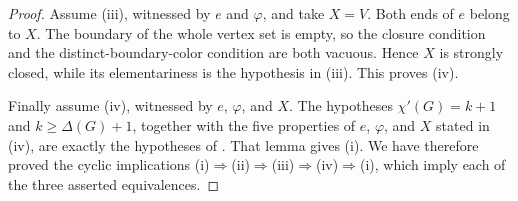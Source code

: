 \begin{proof}
Assume (iii), witnessed by $e$ and $\varphi$, and take $X=V$.  Both ends of
$e$ belong to $X$.  The boundary of the whole vertex set is empty, so the
closure condition and the distinct-boundary-color condition are both
vacuous.  Hence $X$ is strongly closed, while its elementariness is the
hypothesis in (iii).  This proves (iv).

Finally assume (iv), witnessed by $e$, $\varphi$, and $X$.  The hypotheses
$\chi'(G)=k+1$ and $k\geq\Delta(G)+1$, together with the five properties of
$e$, $\varphi$, and $X$ stated in (iv), are exactly the hypotheses of
.  That lemma gives (i).  We have
therefore proved the cyclic implications
(i)$\Rightarrow$(ii)$\Rightarrow$(iii)$\Rightarrow$(iv)$\Rightarrow$(i),
which imply each of the three asserted equivalences.
\end{proof}
